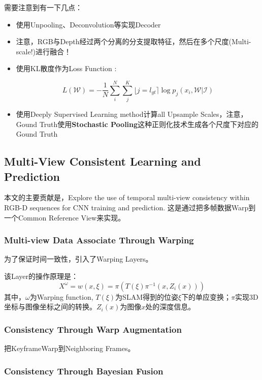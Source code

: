 需要注意到有一下几点：
\begin{itemize}
\item 使用Unpooling、Deconvolution等实现Decoder
\item 注意，RGB与Depth经过两个分离的分支提取特征，然后在多个尺度(Multi-scale!)进行融合！
\item 使用KL散度作为Loss Function :

\begin{displaymath}
L(\mathcal{W}) = - \frac{1}{N} \sum_{i}^{N}\sum_{j}^{K}\lfloor j = l_{gt} \rceil \log p_j (x_i, \mathcal{W} | \mathcal{I})
\end{displaymath}

\item 使用Deeply Supervised Learning method计算all Upsample Scales，注意，Gound Truth使用\textbf{Stochastic Pooling}这种正则化技术生成各个尺度下对应的Gound Truth
\end{itemize}

\subsection{Multi-View Consistent Learning and Prediction}

本文的主要贡献是，Explore the use of temporal multi-view consistency within RGB-D sequences for CNN training and prediction. 这是通过把多帧数据Warp到一个Common Reference View来实现。

\subsubsection{Multi-view Data Associate Through Warping}

为了保证时间一致性，引入了Warping Layers。

该Layer的操作原理是：
\begin{displaymath}
X^{\omega} = w(x, \xi) = \pi (T(\xi)\pi^{-1}(x, Z_i(x)))
\end{displaymath}
其中，$\omega$为Warping function, $T(\xi)$为SLAM得到的位姿$\xi$下的单应变换；$\pi$实现3D坐标与图像坐标之间的转换。$Z_i(x)$为图像$x$处的深度信息。

\subsubsection{Consistency Through Warp Augmentation}

把KeyframeWarp到Neighboring Frames。

\subsubsection{Consistency Through Bayesian Fusion}

